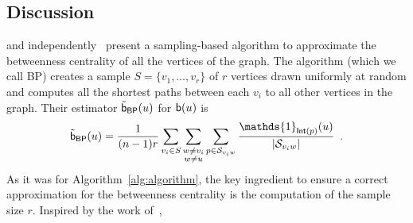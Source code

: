 \subsection{Discussion}\label{sec:discussion}
\citet{JacobKLPT05} and independently~\citet{BrandesP07} present a
sampling-based algorithm to approximate the betweenness centrality of all the
vertices of the graph. The algorithm (which we call \textsf{BP}) creates a
sample $S=\{v_1,\dotsc,v_r\}$ of $r$ vertices drawn uniformly at random and
computes all the shortest paths between each $v_i$ to all other vertices in the
graph. Their estimator $\tilde{\mathsf{b}}_\mathsf{BP}(u)$ for $\mathsf{b}(u)$ is
\[ 
\tilde\betw_\mathsf{BP}(u)= \frac{1}{(n-1)r}\sum_{v_i\in S}\sum_{\substack{w\neq
v_i\\w\neq
u}}\sum_{p\in\mathcal{S}_{v_iw}}\frac{\mathds{1}_{\mathsf{Int}(p)}(u)}{|\mathcal{S}_{v_iw}|}\enspace.
\]
As it was for Algorithm~\ref{alg:algorithm}, the key ingredient to ensure a correct
approximation for the betweenness centrality is the computation of the sample
size $r$. Inspired by the work of~\citet{EppsteinW04}, \citet{BrandesP07} 
%
